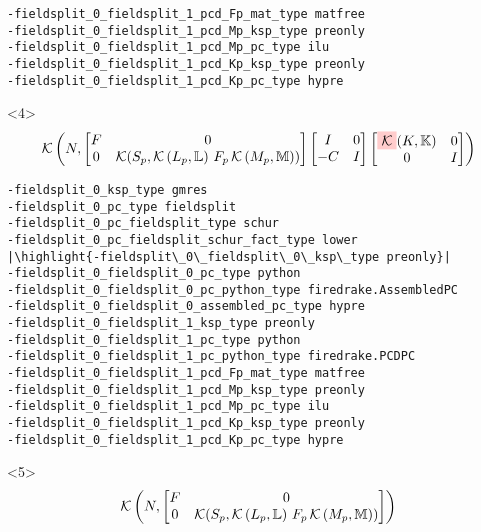 \documentclass[presentation]{beamer}
\newcommand{\KSP}[2]{\ensuremath{\mathcal{K}\left(#1, \mathbb{#2}\right)}}
\newcommand{\highlight}[1]{\colorbox{red!20}{\color{black} #1}}
\begin{document}
\begin{frame}[fragile]
\begin{onlyenv}
\begin{verbatim}
-fieldsplit_0_fieldsplit_1_pcd_Fp_mat_type matfree
-fieldsplit_0_fieldsplit_1_pcd_Mp_ksp_type preonly
-fieldsplit_0_fieldsplit_1_pcd_Mp_pc_type ilu
-fieldsplit_0_fieldsplit_1_pcd_Kp_ksp_type preonly
-fieldsplit_0_fieldsplit_1_pcd_Kp_pc_type hypre
\end{verbatim}
  \end{onlyenv}
  \begin{onlyenv}<4>
    \color{gray}
    \begin{equation*}
      \KSP{N}{%
        \begin{bmatrix}
        F & 0 \\
        0 & \mathcal{K}(S_p, \KSP{L_p}{L}\,F_p \, \KSP{M_p}{M})
      \end{bmatrix}
      \begin{bmatrix}
        I & 0\\
        -C & I
      \end{bmatrix}
      \begin{bmatrix}
        \highlight{$\mathcal{K}$}(K, \mathbb{K}) & 0 \\
        0 & I
      \end{bmatrix}}
    \end{equation*}
\begin{verbatim}
-fieldsplit_0_ksp_type gmres
-fieldsplit_0_pc_type fieldsplit
-fieldsplit_0_pc_fieldsplit_type schur
-fieldsplit_0_pc_fieldsplit_schur_fact_type lower
|\highlight{-fieldsplit\_0\_fieldsplit\_0\_ksp\_type preonly}|
-fieldsplit_0_fieldsplit_0_pc_type python
-fieldsplit_0_fieldsplit_0_pc_python_type firedrake.AssembledPC
-fieldsplit_0_fieldsplit_0_assembled_pc_type hypre
-fieldsplit_0_fieldsplit_1_ksp_type preonly
-fieldsplit_0_fieldsplit_1_pc_type python
-fieldsplit_0_fieldsplit_1_pc_python_type firedrake.PCDPC
-fieldsplit_0_fieldsplit_1_pcd_Fp_mat_type matfree
-fieldsplit_0_fieldsplit_1_pcd_Mp_ksp_type preonly
-fieldsplit_0_fieldsplit_1_pcd_Mp_pc_type ilu
-fieldsplit_0_fieldsplit_1_pcd_Kp_ksp_type preonly
-fieldsplit_0_fieldsplit_1_pcd_Kp_pc_type hypre
\end{verbatim}
  \end{onlyenv}
  \begin{onlyenv}<5>
    \color{gray}
    \begin{equation*}
      \KSP{N}{%
        \begin{bmatrix}
        F & 0 \\
        0 & \mathcal{K}(S_p, \KSP{L_p}{L}\,F_p \, \KSP{M_p}{M})
      \end{bmatrix}
}
\end{equation*}
\end{onlyenv}
\end{frame}
\end{document}
